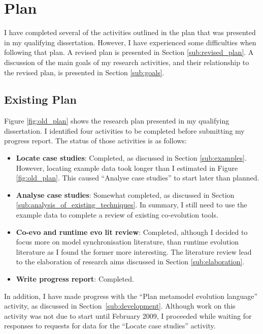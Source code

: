 \section{Plan}
I have completed several of the activities outlined in the plan that was presented in my qualifying dissertation. However, I have experienced some difficulties when following that plan. A revised plan is presented in Section \ref{sub:revised_plan}. A discussion of the main goals of my research activities, and their relationship to the revised plan, is presented in Section \ref{sub:goals}.


\subsection{Existing Plan}
\label{sub:existing_plan}
Figure \ref{fig:old_plan} shows the research plan presented in my qualifying dissertation. I identified four activities to be completed before submitting my progress report. The status of those activities is as follows:

\begin{itemize}
	\item \textbf{Locate case studies}: Completed, as discussed in Section \ref{sub:examples}. However, locating example data took longer than I estimated in Figure \ref{fig:old_plan}. This caused ``Analyse case studies'' to start later than planned.
	\item \textbf{Analyse case studies}: Somewhat completed, as discussed in Section \ref{sub:analysis_of_existing_techniques}. In summary, I still need to use the example data to complete a review of existing co-evolution tools.
	\item \textbf{Co-evo and runtime evo lit review}: Completed, although I decided to focus more on model synchronisation literature, than runtime evolution literature as I found the former more interesting. The literature review lead to the elaboration of research aims discussed in Section \ref{sub:elaboration}.
	\item \textbf{Write progress report}: Completed.
\end{itemize}

In addition, I have made progress with the ``Plan metamodel evolution language'' activity, as discussed in Section~\ref{sub:development}. Although work on this activity was not due to start until February 2009, I proceeded while waiting for responses to requests for data for the ``Locate case studies'' activity.


